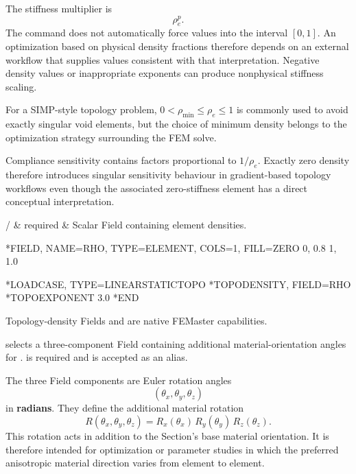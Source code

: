 The stiffness multiplier is
\[
\rho_e^p.
\]
The command does not automatically force values into the interval \([0,1]\). An optimization based on physical density fractions therefore depends on an external workflow that supplies values consistent with that interpretation. Negative density values or inappropriate exponents can produce nonphysical stiffness scaling.

For a SIMP-style topology problem, \(0<\rho_\mathrm{min}\leq\rho_e\leq1\) is commonly used to avoid exactly singular void elements, but the choice of minimum density belongs to the optimization strategy surrounding the FEM solve.

Compliance sensitivity contains factors proportional to \(1/\rho_e\). Exactly zero density therefore introduces singular sensitivity behaviour in gradient-based topology workflows even though the associated zero-stiffness element has a direct conceptual interpretation.

\begin{keywordparameters}
 /  & required & Scalar  Field containing element densities. \\
\end{keywordparameters}

\exampleheading
\begin{dialectexamples}
\begin{femasterdeck}
*FIELD, NAME=RHO, TYPE=ELEMENT,
 COLS=1, FILL=ZERO
0, 0.8
1, 1.0

*LOADCASE, TYPE=LINEARSTATICTOPO
*TOPODENSITY, FIELD=RHO
*TOPOEXPONENT
3.0
*END
\end{femasterdeck}
\begin{noabaqus}
Topology-density Fields and  are native FEMaster capabilities.
\end{noabaqus}
\end{dialectexamples}


 selects a three-component  Field containing additional material-orientation angles for .  is required and  is accepted as an alias.

The three Field components are Euler rotation angles
\[
(\theta_x,\theta_y,\theta_z)
\]
in \textbf{radians}. They define the additional material rotation
\[
R(\theta_x,\theta_y,\theta_z)
=R_x(\theta_x)\,R_y(\theta_y)\,R_z(\theta_z).
\]
This rotation acts in addition to the Section's base material orientation. It is therefore intended for optimization or parameter studies in which the preferred anisotropic material direction varies from element to element.

